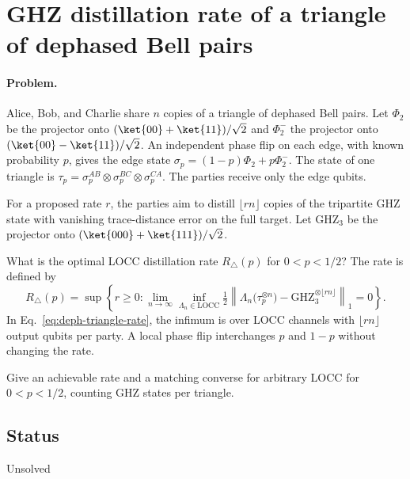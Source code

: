 \section{GHZ distillation rate of a triangle of dephased Bell pairs}
\label{sec:op_4ada32907dfeb9b5}

\paragraph{Problem.}
Alice, Bob, and Charlie share $n$ copies of a triangle of dephased Bell pairs. Let $\Phi_2$ be the projector onto $(\ket{00}+\ket{11})/\sqrt{2}$ and $\Phi_2^-$ the projector onto $(\ket{00}-\ket{11})/\sqrt{2}$. An independent phase flip on each edge, with known probability $p$, gives the edge state $\sigma_p=(1-p)\Phi_2+p\Phi_2^-$. The state of one triangle is $\tau_p=\sigma_p^{AB}\otimes\sigma_p^{BC}\otimes\sigma_p^{CA}$. The parties receive only the edge qubits.

For a proposed rate $r$, the parties aim to distill $\lfloor rn\rfloor$ copies of the tripartite GHZ state with vanishing trace-distance error on the full target. Let $\mathrm{GHZ}_3$ be the projector onto $(\ket{000}+\ket{111})/\sqrt{2}$.

What is the optimal LOCC distillation rate $R_\triangle(p)$ for $0<p<1/2$? The rate is defined by
\begin{equation}
  R_\triangle(p)=\sup\left\{r\geq 0:\lim_{n\to\infty}\inf_{\Lambda_n\in\mathrm{LOCC}}
  \tfrac12\left\lVert\Lambda_n\bigl(\tau_p^{\otimes n}\bigr)
  -\mathrm{GHZ}_3^{\otimes\lfloor rn\rfloor}\right\rVert_1=0\right\}.
  \label{eq:deph-triangle-rate}
\end{equation}
In Eq.~\eqref{eq:deph-triangle-rate}, the infimum is over LOCC channels with $\lfloor rn\rfloor$ output qubits per party. A local phase flip interchanges $p$ and $1-p$ without changing the rate.

Give an achievable rate and a matching converse for arbitrary LOCC for $0<p<1/2$, counting GHZ states per triangle.

\subsection*{Status}

Unsolved

